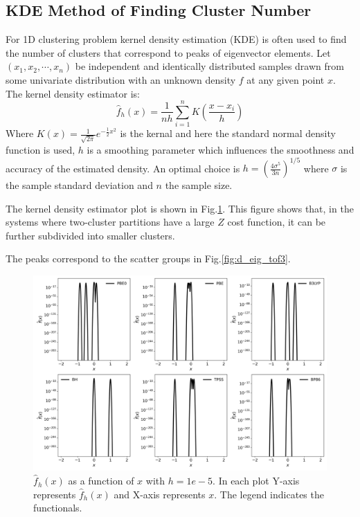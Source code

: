 \documentclass[letterpaper,12pt]{article}
\begin{document}
\subsection{KDE Method of Finding Cluster Number}
For 1D clustering problem kernel density estimation (KDE) is often used to find the number of clusters that correspond to peaks of eigenvector elements. 
Let $(x_1, x_2, \cdots, x_n)$ be independent and identically distributed samples drawn from some univariate distribution with an unknown density $f$ at any given point $x$.
The kernel density estimator is:
\begin{equation}
    \hat{f}_h(x) = \frac{1}{nh} \sum\limits_{i=1}^n K(\frac{x-x_i}{h})
\end{equation}
Where $K(x) = \frac{1}{\sqrt{2\pi} } e^{-\frac{1}{2}x^2}$ is the kernal and here the standard normal density function is used, $h$ is a smoothing parameter which influences the smoothness and accuracy of the estimated density. An optimal choice\cite{silverman_density_1998} is $h=(\frac{4 \sigma^5}{3n})^{1/5}$ where $\sigma$ is the sample standard deviation and $n$ the sample size.

The kernel density estimator plot is shown in Fig.\ref{fig:kde}. This figure shows that, in the systems where two-cluster partitions have a large $Z$ cost function, it can be further subdivided into smaller clusters. 

The peaks correspond to the scatter groups in Fig.\ref{fig:d_eig_tof3}. 

\begin{figure}
    \centering
    \includegraphics[width=1.0\textwidth]{figs/kde.png}
    \caption{$\hat{f}_h(x)$ as a function of $x$ with $h=1e-5$. In each plot Y-axis represents $\hat{f}_h(x)$ and X-axis represents $x$. The legend indicates the functionals.}
    \label{fig:kde}
\end{figure}
\end{document}

